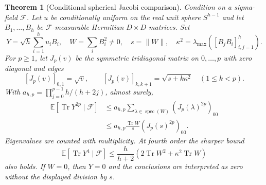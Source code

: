 \documentclass[11pt,a4paper]{article}
\newtheorem{theorem}{Theorem}[section]
\theoremstyle{definition}\newtheorem{definition}[theorem]{Definition}
\theoremstyle{remark}\newtheorem{remark}[theorem]{Remark}
\numberwithin{equation}{section}
\begin{document}
\begin{theorem}[Conditional spherical Jacobi comparison]
\label{thm:conditional-spherical-jacobi}
Condition on a sigma-field $\mathcal F$.  Let $u$ be conditionally uniform
on the real unit sphere $S^{h-1}$ and let
$B_1,\ldots,B_h$ be $\mathcal F$-measurable Hermitian $D\times D$ matrices.
Set
\[
 Y=\sqrt h\sum_{i=1}^h u_iB_i,\quad
 W=\sum_iB_i^2\ne0,\quad s=\|W\|,\quad
 \kappa^2=\lambda_{\max}([B_jB_i]_{i,j=1}^h).
\]
For $p\ge1$, let $J_p(v)$ be the symmetric tridiagonal matrix on
$0,\ldots,p$ with zero diagonal and edges
\[
 [J_p(v)]_{0,1}=\sqrt v,\qquad
 [J_p(v)]_{k,k+1}=\sqrt{s+k\kappa^2}\quad(1\le k<p).
\]
With $a_{h,p}=\prod_{j=0}^{p-1}h/(h+2j)$, almost surely,
\begin{align}
 \mathbb E[\operatorname{Tr}Y^{2p}\mid\mathcal F]
 &\le a_{h,p}\sum_{\lambda\in\operatorname{spec}(W)}
                    (J_p(\lambda)^{2p})_{00}\label{eq:spherical-jacobi}\\
 &\le a_{h,p}\frac{\operatorname{Tr}W}{s}
                    (J_p(s)^{2p})_{00}.\nonumber
\end{align}
Eigenvalues are counted with multiplicity.  At fourth order the sharper
bound
\begin{equation}\label{eq:spherical-linear-fourth}
 \mathbb E[\operatorname{Tr}Y^4\mid\mathcal F]
 \le\frac{h}{h+2}
          \left(2\operatorname{Tr}W^2+\kappa^2\operatorname{Tr}W\right)
\end{equation}
also holds.  If $W=0$, then $Y=0$ and the conclusions are interpreted
as zero without the displayed division by $s$.
\end{theorem}
\end{document}

